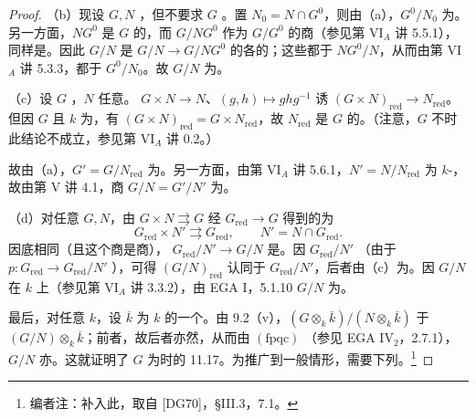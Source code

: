 \begin{proof}
（b）现设 $G,N$ ，但不要求 $G$ 。置 $N_0=N\cap G^0$，则由（a），$G^0/N_0$ 为。另一方面，$NG^0$ 是 $G$ 的，而 $G/NG^0$ 作为 $G/G^0$ 的商（参见第 VI$_A$ 讲 5.5.1），同样是。因此 $G/N$ 是 $G/N\to G/NG^0$ 的各的；这些都于 $NG^0/N$，从而由第 VI$_A$ 讲 5.3.3，都于 $G^0/N_0$。故 $G/N$ 为。

（c）设 $G$ ，$N$ 任意。 $G\times N\to N$、$(g,h)\mapsto ghg^{-1}$ 诱 $(G\times N)_{\mathrm{red}}\to N_{\mathrm{red}}$。但因 $G$ 且 $k$ 为，有 $(G\times N)_{\mathrm{red}}=G\times N_{\mathrm{red}}$，故 $N_{\mathrm{red}}$ 是 $G$ 的。（注意，$G$ 不时此结论不成立，参见第 VI$_A$ 讲 0.2。）

故由（a），$G'=G/N_{\mathrm{red}}$ 为。另一方面，由第 VI$_A$ 讲 5.6.1，$N'=N/N_{\mathrm{red}}$ 为 $k$-，故由第 V 讲 4.1，商 $G/N=G'/N'$ 为。

（d）对任意 $G,N$，由 $G\times N\rightrightarrows G$ 经 $G_{\mathrm{red}}\to G$ 得到的为
\[
G_{\mathrm{red}}\times N'\rightrightarrows G_{\mathrm{red}},\qquad
N'=N\cap G_{\mathrm{red}}.
\]
因底相同（且这个商是商）， $G_{\mathrm{red}}/N'\to G/N$ 是。因 $G_{\mathrm{red}}/N'$ （由于 $p:G_{\mathrm{red}}\to G_{\mathrm{red}}/N'$ ），可得 $(G/N)_{\mathrm{red}}$ 认同于 $G_{\mathrm{red}}/N'$，后者由（c）为。因 $G/N$ 在 $k$ 上（参见第 VI$_A$ 讲 3.3.2），由 EGA I，5.1.10  $G/N$ 为。

最后，对任意 $k$，设 $\overline k$ 为 $k$ 的一个。由 9.2（v），$(G\otimes_k\overline k)/(N\otimes_k\overline k)$ 于 $(G/N)\otimes_k\overline k$；前者，故后者亦然，从而由 $(\mathrm{fpqc})$ （参见 EGA
IV$_2$，2.7.1），$G/N$ 亦。这就证明了 $G$ 为时的 11.17。为推广到一般情形，需要下列。\footnote{编者注：补入此，取自 [DG70]，§III.3，7.1。}
\end{proof}

